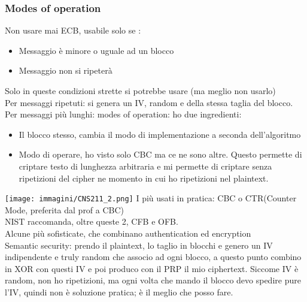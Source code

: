 \documentclass[16px]{article}
\begin{document}
\subsubsection{Modes of operation}
Non usare mai ECB, usabile solo se :
\begin{itemize}
\item Messaggio è minore o uguale ad un blocco
\item Messaggio non si ripeterà
\end{itemize}
Solo in queste condizioni strette si potrebbe usare (ma meglio non usarlo)\\ Per messaggi ripetuti: si genera un IV, random e della stessa taglia del blocco.\\ Per messaggi più lunghi: modes of operation: ho due ingredienti:
\begin{itemize}
\item Il blocco stesso, cambia il modo di implementazione a seconda dell'algoritmo
\item Modo di operare, ho visto solo CBC ma ce ne sono altre. Questo permette di criptare testo di lunghezza arbitraria e mi permette di criptare senza ripetizioni del cipher ne momento in cui ho ripetizioni nel plaintext.
\end{itemize}
\texttt{[image: immagini/CNS211\_2.png]}
I più usati in pratica: CBC o CTR(Counter Mode, preferita dal prof a CBC)\\ NIST raccomanda, oltre queste 2, CFB e OFB.\\ Alcune più sofisticate, che combinano authentication ed encryption\\ Semantic security: prendo il plaintext, lo taglio in blocchi e genero un IV indipendente e truly random che associo ad ogni blocco, a questo punto combino in XOR con questi IV e poi produco con il PRP il mio ciphertext. Siccome IV è random, non ho ripetizioni, ma ogni volta che mando il blocco devo spedire pure l'IV, quindi non è soluzione pratica; è il meglio che posso fare.
\end{document}
